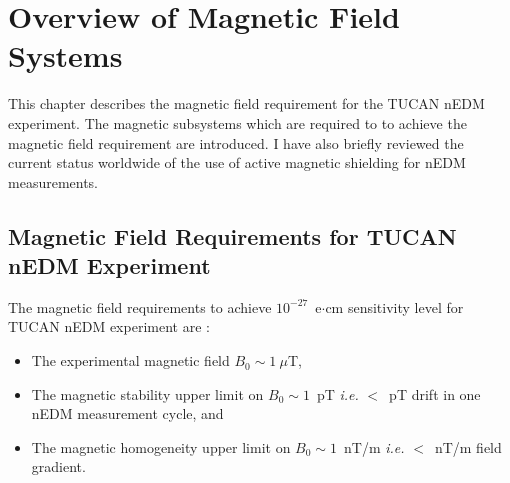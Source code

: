 \chapter{Overview of Magnetic Field Systems}\label{ch:magnetics}



This chapter describes the magnetic field requirement for the TUCAN nEDM experiment. The magnetic subsystems which are required to to achieve the magnetic field requirement are introduced. I have also briefly reviewed the current status worldwide of the use of active magnetic shielding for nEDM measurements.


\section{Magnetic Field Requirements for TUCAN nEDM Experiment}\label{sec:msr}

The magnetic field requirements to achieve $10^{-27}$~e$\cdot$cm sensitivity level for TUCAN nEDM experiment are :

\begin{itemize}

    \item The experimental magnetic field $B_0\sim1~\mu$T, 
    \item The magnetic stability upper limit on $B_0\sim1$~pT {\it i.e.} $<$~pT drift in one nEDM measurement cycle, and 
    \item The magnetic homogeneity upper limit on $B_0\sim1$~nT/m {\it i.e.} $<$~nT/m field gradient. 
    
\end{itemize}





